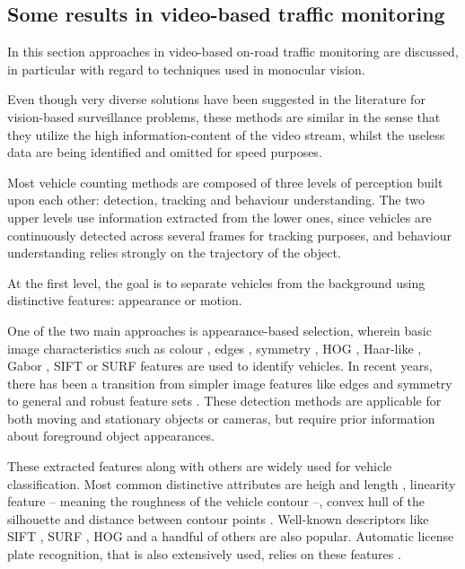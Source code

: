 \subsection{Some results in video-based traffic monitoring}
In this section approaches in video-based on-road traffic monitoring are discussed, in particular with regard to techniques used in monocular vision.

Even though very diverse solutions have been suggested in the literature for vision-based surveillance problems, these methods are similar in the sense that they utilize the high information-content of the video stream, whilst the useless data are being identified and omitted for speed purposes.

Most vehicle counting methods are composed of three levels of perception built upon each other: detection, tracking and behaviour understanding.
The two upper levels use information extracted from the lower ones, since vehicles are continuously detected across several frames for tracking purposes, and behaviour understanding relies strongly on the trajectory of the object.

At the first level, the goal is to separate vehicles from the background using distinctive features: appearance or motion.

One of the two main approaches is appearance-based selection, wherein basic image characteristics such as colour \cite{Chang2005}, edges \cite{Blanc2007}, symmetry \cite{Aytekin2010}, HOG \cite{Niknejad2012}, Haar-like \cite{Sivaraman2012}, Gabor \cite{Zhang2006}, SIFT \cite{Zhang2011} or SURF \cite{Lin2012} features are used to identify vehicles.
In recent years, there has been a transition from simpler image features like edges and symmetry to general and robust feature sets \cite{Sivaraman2012}.
These detection methods are applicable for both moving and stationary objects or cameras, but require prior information about foreground object appearances.

These extracted features along with others are widely used for vehicle classification.
Most common distinctive attributes are heigh and length \cite{Huang2004}, linearity feature -- meaning the roughness of the vehicle contour \cite{Zhang2008} --, convex hull of the silhouette \cite{Buch2010} and distance between contour points \cite{Lou2005}.
Well-known descriptors like SIFT \cite{Zhang2011}, SURF \cite{Lin2012}, HOG \cite{Niknejad2012} and a handful of others are also popular.
Automatic license plate recognition, that is also extensively used, relies on these features \cite{Luvizon2016}. 

